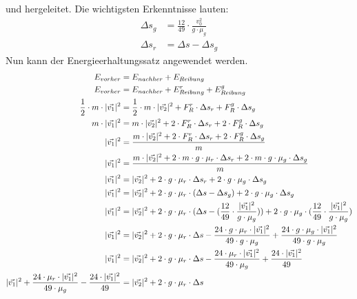 und hergeleitet. Die wichtigsten Erkenntnisse lauten:
\begin{align}
    \Delta s_g &= \frac{12}{49} \cdot \frac{v_0^2}{g \cdot \mu_g}\\
    \Delta s_r &= \Delta s - \Delta s_g
\end{align}
Nun kann der Energieerhaltungssatz angewendet werden.
\begin{align}
    E_{vorher} &= E_{nachher} + E_{Reibung}\\
    E_{vorher} &= E_{nachher} + E^r_{Reibung} + E^g_{Reibung}\\
    \frac{1}{2} \cdot m \cdot \norm{\vec{v_1}}^2 &= \frac{1}{2} \cdot m \cdot \norm{\vec{v_2}}^2 + F^r_R \cdot \Delta s_r + F^g_R \cdot \Delta s_g\\
    m \cdot \norm{\vec{v_1}}^2 &= m \cdot \norm{\vec{v_2}}^2 + 2 \cdot F^r_R \cdot \Delta s_r + 2 \cdot F^g_R \cdot \Delta s_g\\
    \norm{\vec{v_1}}^2 &= \frac{m \cdot \norm{\vec{v_2}}^2 + 2 \cdot F^r_R \cdot \Delta s_r + 2 \cdot F^g_R \cdot \Delta s_g}{m}\\
    \norm{\vec{v_1}}^2 &= \frac{m \cdot \norm{\vec{v_2}}^2 + 2 \cdot m \cdot g \cdot \mu_r \cdot \Delta s_r + 2 \cdot m \cdot g \cdot \mu_g \cdot \Delta s_g}{m}\\
    \norm{\vec{v_1}}^2 &= \norm{\vec{v_2}}^2 + 2 \cdot g \cdot \mu_r \cdot \Delta s_r + 2 \cdot g \cdot \mu_g \cdot \Delta s_g\\
    \norm{\vec{v_1}}^2 &= \norm{\vec{v_2}}^2 + 2 \cdot g \cdot \mu_r \cdot (\Delta s - \Delta s_g) + 2 \cdot g \cdot \mu_g \cdot \Delta s_g\\
    \norm{\vec{v_1}}^2 &= \norm{\vec{v_2}}^2 + 2 \cdot g \cdot \mu_r \cdot (\Delta s - (\frac{12}{49} \cdot \frac{\norm{\vec{v_1}}^2}{g \cdot \mu_g})) + 2 \cdot g \cdot \mu_g \cdot (\frac{12}{49} \cdot \frac{\norm{\vec{v_1}}^2}{g \cdot \mu_g})\\
    \norm{\vec{v_1}}^2 &= \norm{\vec{v_2}}^2 + 2 \cdot g \cdot \mu_r \cdot \Delta s - \frac{24 \cdot g \cdot \mu_r \cdot \norm{\vec{v_1}}^2}{49 \cdot g \cdot \mu_g} + \frac{24 \cdot g \cdot \mu_g \cdot \norm{\vec{v_1}}^2}{49 \cdot g \cdot \mu_g}\\
    \norm{\vec{v_1}}^2 &= \norm{\vec{v_2}}^2 + 2 \cdot g \cdot \mu_r \cdot \Delta s - \frac{24 \cdot \mu_r \cdot \norm{\vec{v_1}}^2}{49 \cdot \mu_g} + \frac{24 \cdot \norm{\vec{v_1}}^2}{49}\\
    \norm{\vec{v_1}}^2 +  \frac{24 \cdot \mu_r \cdot \norm{\vec{v_1}}^2}{49 \cdot \mu_g} - \frac{24 \cdot \norm{\vec{v_1}}^2}{49} &= \norm{\vec{v_2}}^2 + 2 \cdot g \cdot \mu_r \cdot \Delta s\\

\end{align}
